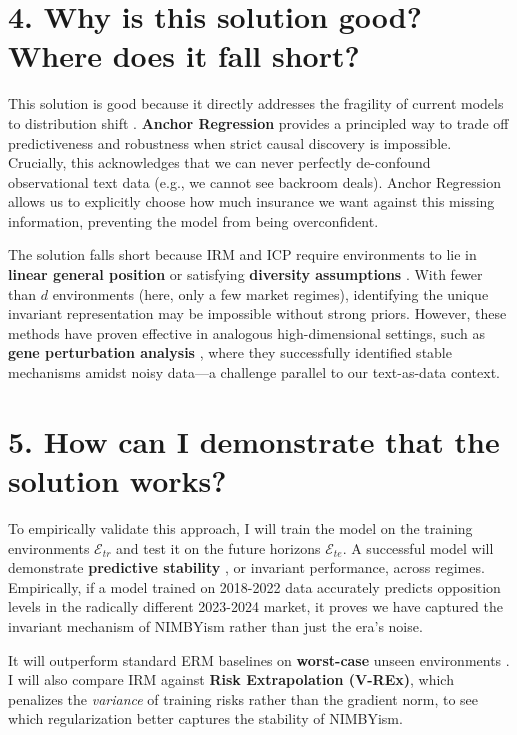 \documentclass[11pt]{article}
\begin{document}
\section*{4. Why is this solution good? Where does it fall short?}
This solution is good because it directly addresses the fragility of current models to distribution shift \autocites{arjovsky2019}{peters2018}
. \textbf{Anchor Regression} provides a principled way to trade off predictiveness and robustness \autocite{buhlmann2020}
when strict causal discovery is impossible.
    Crucially, this acknowledges that we can never perfectly de-confound observational text data (e.g., we cannot see backroom deals). Anchor Regression allows us to explicitly choose how much insurance we want against this missing information, preventing the model from being overconfident.

The solution falls short because IRM and ICP require environments to lie in \textbf{linear general position} \autocite[Theorem~9]{arjovsky2019} or satisfying \textbf{diversity assumptions} \autocite{peters2016}.
With fewer than $d$ environments (here, only a few market regimes), identifying the unique invariant representation may be impossible without strong priors. However, these methods have proven effective in analogous high-dimensional settings, such as \textbf{gene perturbation analysis} \autocites{wu2025b}{kemmeren2014}, where they successfully identified stable mechanisms amidst noisy data---a challenge parallel to our text-as-data context.

\section*{5. How can I demonstrate that the solution works?}
To empirically validate this approach, I will train the model on the training environments $\mathcal{E}_{tr}$ and test it on the future horizons $\mathcal{E}_{te}$. A successful model will demonstrate \textbf{predictive stability} \autocite{buhlmann2020}
, or invariant performance, across regimes.
    Empirically, if a model trained on 2018-2022 data accurately predicts opposition levels in the radically different 2023-2024 market, it proves we have captured the invariant mechanism of NIMBYism rather than just the era's noise.

It will outperform standard ERM baselines on \textbf{worst-case} unseen environments \autocites{krueger2021}{buhlmann2020}.
I will also compare IRM against \textbf{Risk Extrapolation (V-REx)}, which penalizes the \textit{variance} of training risks \autocite[Eq.~8]{krueger2021} rather than the gradient norm, to see which regularization better captures the stability of NIMBYism.

\printbibliography[title=References]
\end{document}
